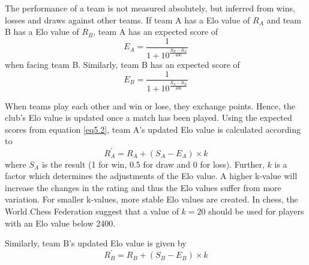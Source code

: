 \begin{comment}
Elo values can be obtained according to equation \ref{eq5.2} and \ref{eq5.4}. Clubelo.com provide historical Elo values for most of the professional football teams in the world, including teams in the English Premier League, English 1st division etc. These values are used in order to compute the relative team strength in this project, using a k-value of 20. A great advantage of the ratings provided by Clubelo is the fact that these values are modified, taking into account home field advantage, goal difference and inter-league adjustments. In addition, the Elo values from Clubelo incorporate all fixtures and not only league matches.
\end{comment}

The performance of a team is not measured absolutely, but inferred from wins, losses and draws against other teams. If team A has a Elo value of $R_A$ and team B has a Elo value of $R_B$, team A has an expected score of 
\begin{equation}\label{eq5.2}
    E_A = \frac{1}{1+10^{\frac{R_B - R_A}{400}}}
\end{equation}
when facing team B. Similarly, team B has an expected score of
\begin{equation}\label{eq5.3}
    E_B = \frac{1}{1+10^{\frac{R_A - R_B}{400}}}
\end{equation}

\newpar
When teams play each other and win or lose, they exchange points. Hence, the club's Elo value is updated once a match has been played. Using the expected scores from equation \ref{eq5.2}, team A's updated Elo value is calculated according to
\begin{equation} \label{eq5.4}
    R^{'}_A = R_A + (S_A-E_A) \times k
\end{equation}
where $S_A$ is the result (1 for win, 0.5 for draw and 0 for loss). Further, $k$ is a factor which determines the adjustments of the Elo value. A higher k-value will increase the changes in the rating and thus the Elo values suffer from more variation. For smaller k-values, more stable Elo values are created. In chess, the World Chess Federation suggest that a value of $k = 20$ should be used for players with an Elo value below 2400. 

\newpar

Similarly, team B's updated Elo value is given by
\begin{equation} \label{eq5.5}
    R^{'}_B = R_B + (S_B-E_B) \times k
\end{equation}

